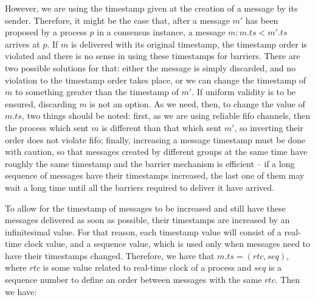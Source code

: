 \documentclass[times, 10pt]{article}
\begin{document}
However, we are using the timestamp given at the creation of a message by its sender. Therefore, it might be the case that, after a message $m'$ has been proposed by a process $p$ in a consensus instance, a message $m : m.ts < m'.ts$ arrives at $p$. If $m$ is delivered with its original timestamp, the timestamp order is violated and there is no sense in using these timestamps for barriers. There are two possible solutions for that: either the message is simply discarded, and no violation to the timestamp order takes place, or we can change the timestamp of $m$ to something greater than the timestamp of $m'$. If uniform validity is to be ensured, discarding $m$ is not an option. As we need, then, to change the value of $m.ts$, two things should be noted: first, as we are using reliable fifo channels, then the process which sent $m$ is different than that which sent $m'$, so inverting their order does not violate fifo; finally, increasing a message timestamp must be done with caution, so that messages created by different groups at the same time have roughly the same timestamp and the barrier mechanism is efficient -- if a long sequence of messages have their timestamps increased, the last one of them may wait a long time until all the barriers required to deliver it have arrived.


To allow for the timestamp of messages to be increased and still have these messages delivered as soon as possible, their timestamps are increased by an infinitesimal value. For that reason, each timestamp value will consist of a real-time clock value, and a sequence value, which is used only when messages need to have their timestamps changed. Therefore, we have that $m.ts = (rtc, seq)$, where $rtc$ is some value related to real-time clock of a process and $seq$ is a sequence number to define an order between messages with the same $rtc$. Then we have:
\end{document}
